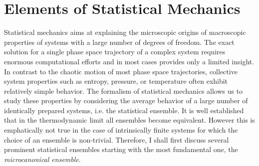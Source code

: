 \documentclass[12pt]{report}
\begin{document}
\chapter{Elements of Statistical Mechanics}
Statistical mechanics aims at explaining the microscopic origins of macroscopic properties of systems with a large number of degrees of freedom. The exact solution for a single phase space trajectory of a complex system requires enormous computational efforts and in most cases provides only a limited insight. In contrast to the chaotic motion of most phase space trajectories, collective system properties such as entropy, pressure, or temperature often exhibit relatively simple behavior. The formalism of statistical mechanics allows us to study these properties by considering the average behavior of a large number of identically prepared systems, i.e. the statistical ensemble. It is well established that in the thermodynamic limit all ensembles become equivalent. However this is emphatically not true in the case of intrinsically finite systems for which the choice of an ensemble is non-trivial. Therefore, I shall first discuss several prominent statistical ensembles starting with the most fundamental one, the \textit{microcanonical ensemble}.
\end{document}
